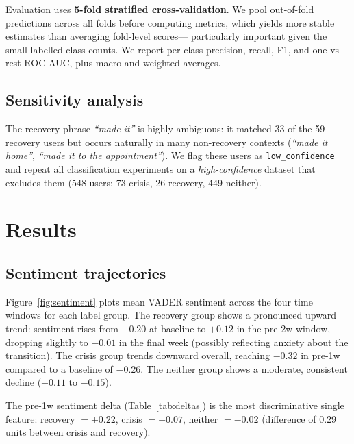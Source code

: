 \documentclass[11pt]{article}
\begin{document}
Evaluation uses \textbf{5-fold stratified cross-validation}.
We pool out-of-fold predictions across all folds before computing metrics,
which yields more stable estimates than averaging fold-level scores---
particularly important given the small labelled-class counts.
We report per-class precision, recall, F1, and one-vs-rest ROC-AUC,
plus macro and weighted averages.

\subsection{Sensitivity analysis}
\label{sec:sensitivity}
The recovery phrase \emph{``made it''} is highly ambiguous: it matched
33 of the 59 recovery users but occurs naturally in many non-recovery
contexts (\emph{``made it home''}, \emph{``made it to the appointment''}).
We flag these users as \texttt{low\_confidence} and repeat all
classification experiments on a \emph{high-confidence} dataset that
excludes them (548 users: 73 crisis, 26 recovery, 449 neither).

\section{Results}
\label{sec:results}

\subsection{Sentiment trajectories}
Figure~\ref{fig:sentiment} plots mean VADER sentiment across the four time
windows for each label group.
The recovery group shows a pronounced upward trend: sentiment rises from
$-0.20$ at baseline to $+0.12$ in the pre-2w window, dropping slightly to
$-0.01$ in the final week (possibly reflecting anxiety about the transition).
The crisis group trends downward overall, reaching $-0.32$ in pre-1w
compared to a baseline of $-0.26$.
The neither group shows a moderate, consistent decline ($-0.11$ to $-0.15$).

The pre-1w sentiment delta (Table~\ref{tab:deltas}) is the
most discriminative single feature: recovery $= +0.22$, crisis $= -0.07$,
neither $= -0.02$ (difference of $0.29$ units between crisis and recovery).
\end{document}
